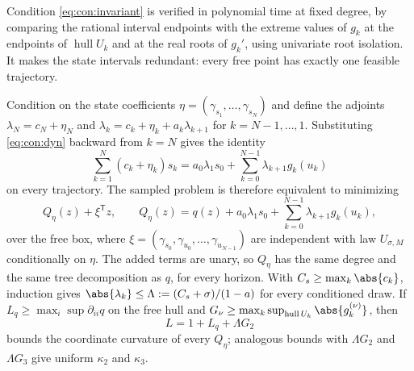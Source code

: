 Condition \eqref{eq:con:invariant} is verified in polynomial time at fixed
degree, by comparing the rational interval endpoints with the extreme values
of $g_k$ at the endpoints of $\operatorname{hull}U_k$ and at the real roots
of $g_k'$, using univariate root isolation. It makes the state intervals
redundant: every free point has exactly one feasible trajectory.

Condition on the state coefficients $\eta=(\gamma_{s_1},\dots,\gamma_{s_N})$
and define the adjoints $\lambda_N=c_N+\eta_N$ and
$\lambda_k=c_k+\eta_k+a_k\lambda_{k+1}$ for $k=N-1,\dots,1$. Substituting
\eqref{eq:con:dyn} backward from $k=N$ gives the identity
\begin{equation}\label{eq:con:adjoint}
 \sum_{k=1}^N(c_k+\eta_k)s_k=a_0\lambda_1s_0+\sum_{k=0}^{N-1}\lambda_{k+1}g_k(u_k)
\end{equation}
on every trajectory. The sampled problem is therefore equivalent to
minimizing
\[
 Q_\eta(z)+\xi^{\mathsf T}z,\qquad
 Q_\eta(z)=q(z)+a_0\lambda_1s_0+\sum_{k=0}^{N-1}\lambda_{k+1}g_k(u_k),
\]
over the free box, where $\xi=(\gamma_{s_0},\gamma_{u_0},\dots,\gamma_{u_{N-1}})$
are independent with law $U_{\sigma,M}$ conditionally on $\eta$. The added
terms are unary, so $Q_\eta$ has the same degree and the same tree
decomposition as $q$, for every horizon. With $C_s\ge\max_k\abs{c_k}$,
induction gives $\abs{\lambda_k}\le\Lambda:=(C_s+\sigma)/(1-a)$ for every
conditioned draw. If $L_q\ge\max_i\sup\partial_{ii}q$ on the free hull and
$G_\nu\ge\max_k\sup_{\operatorname{hull}U_k}\abs{g_k^{(\nu)}}$, then
\begin{equation}\label{eq:con:Lact}
 L=1+L_q+\Lambda G_2
\end{equation}
bounds the coordinate curvature of every $Q_\eta$; analogous bounds with
$\Lambda G_2$ and $\Lambda G_3$ give uniform $\kappa_2$ and $\kappa_3$.

